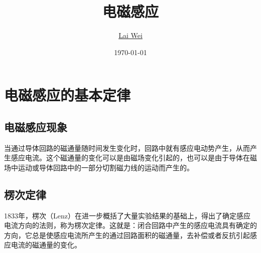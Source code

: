 \documentclass[12pt]{article}
\title{电磁感应}
\author{\href{mailto:lai-wei@whu.edu.cn}{Lai Wei}}
\date{\today}
\begin{document}
\maketitle
 
\section{电磁感应的基本定律}

\subsection{电磁感应现象}

当通过导体回路的磁通量随时间发生变化时，回路中就有感应电动势产生，从而产生感应电流。这个磁通量的变化可以是由磁场变化引起的，也可以是由于导体在磁场中运动或导体回路中的一部分切割磁力线的运动而产生的。

\subsection{楞次定律}

1833年，楞次（Lenz）在进一步概括了大量实验结果的基础上，得出了确定感应电流方向的法则，称为楞次定律。这就是：闭合回路中产生的感应电流具有确定的方向，它总是使感应电流所产生的通过回路面积的磁通量，去补偿或者反抗引起感应电流的磁通量的变化。
\end{document}
